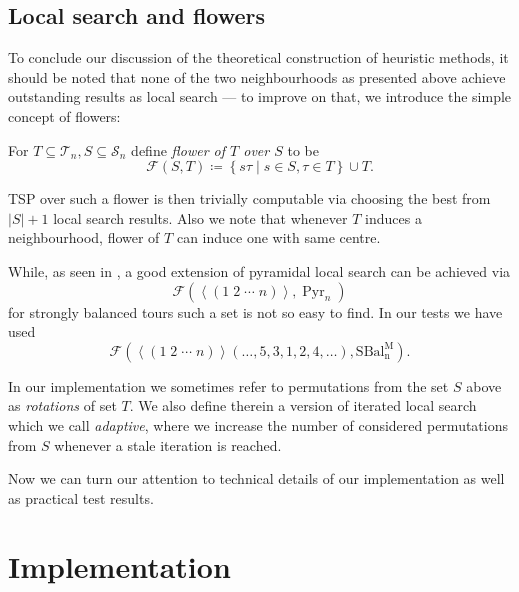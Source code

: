 \documentclass[index=totoc,bibliography=totoc]{scrartcl}
\numberwithin{equation}{section}
\numberwithin{figure}{section}
\numberwithin{table}{section}
\let\defstyle\itshape
\begin{document}
\subsection{Local search and flowers}

To conclude our discussion of the theoretical construction of heuristic
methods, it should be noted that none of the two neighbourhoods as
presented above achieve outstanding results as local search --- to improve
on that, we introduce the simple concept of flowers:

\begin{define}
  For $T \subseteq \mathcal{T}_n, S \subseteq \mathcal{S}_n$ define
  {\defstyle flower of $T$ over $S$} to be
  \[
    \mathcal{F}\left(S,T\right) \coloneqq
    \left\{ s \tau \mid s \in S, \tau \in T\right\} \cup T.
  \]
\end{define}

TSP over such a flower is then trivially computable via choosing the best
from $\left|S\right|+1$ local search results.  Also we note that whenever
$T$ induces a neighbourhood, flower of $T$ can induce one with same centre.

While, as seen in \cite{belperm}, a good extension of pyramidal local
search can be achieved via
\[
  \mathcal{F}\left(
    \left<\left( 1\;2\;\cdots\;n\right)\right>,
    \operatorname{Pyr}_n
  \right)
\]
for strongly balanced tours such a set is not so easy to find.
In our tests we have used
\[
  \mathcal{F}\left(
  \left<\left( 1\;2\;\cdots\;n\right)\right>
    \left(\ldots , 5, 3, 1, 2, 4, \ldots\right),
    \operatorname{SBal_n^M}
  \right).
\]

In our implementation we sometimes refer to permutations from the set $S$ above
as {\defstyle rotations} of set $T$.
We also define therein a version of iterated local search which we call
{\defstyle adaptive}, where we increase the number of considered permutations
from $S$ whenever a stale iteration is reached.

Now we can turn our attention to technical details of our implementation
as well as practical test results.
\clearpage

\section{Implementation}
\end{document}
